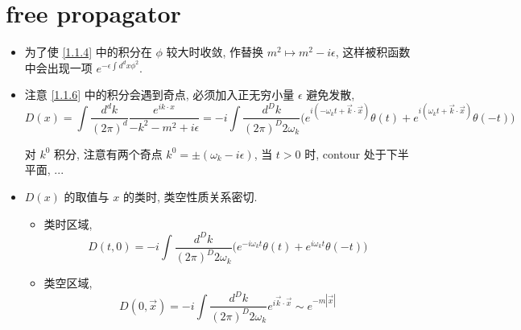 \section{free propagator}
\begin{itemize}
	\item 为了使 \eqref{1.1.4} 中的积分在 $\phi$ 较大时收敛, 作替换 $m^2 \mapsto m^2 - i \epsilon$, 这样被积函数中会出现一项 $e^{- \epsilon \int d^d x \phi^2}$.
	
	\item 注意 \eqref{1.1.6} 中的积分会遇到奇点, 必须加入正无穷小量 $\epsilon$ 避免发散,
	\begin{equation} \label{1.2.1}
		D(x) = \int \frac{d^d k}{(2 \pi)^d} \frac{e^{i k \cdot x}}{- k^2 - m^2 + i \epsilon} = - i \int \frac{d^D k}{(2 \pi)^D 2 \omega_k} \Big( e^{i (- \omega_k t + \vec{k} \cdot \vec{x})} \theta(t) + e^{i (\omega_k t + \vec{k} \cdot \vec{x})} \theta(- t) \Big)
	\end{equation}
	
	\begin{tcolorbox}[title=calculation:]
		对 $k^0$ 积分, 注意有两个奇点 $k^0 = \pm (\omega_k - i \epsilon)$, 当 $t > 0$ 时, contour 处于下半平面, ...
	\end{tcolorbox}
	
	\item $D(x)$ 的取值与 $x$ 的类时, 类空性质关系密切.
	\begin{itemize}
		\item 类时区域,
		\begin{equation}
			D(t, 0) = - i \int \frac{d^D k}{(2 \pi)^D 2 \omega_k} \Big( e^{- i \omega_k t} \theta(t) + e^{i \omega_k t} \theta(- t) \Big)
		\end{equation}
		
		\item 类空区域,
		\begin{equation}
			D(0, \vec{x}) = - i \int \frac{d^D k}{(2 \pi)^D 2 \omega_k} e^{i \vec{k} \cdot \vec{x}} \sim e^{- m |\vec{x}|}
		\end{equation}
	\end{itemize}
\end{itemize}
